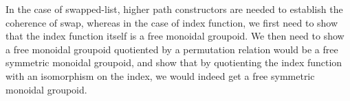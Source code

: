 \documentclass{article}
\begin{document}
In the case of swapped-list, higher path constructors are needed to establish the coherence of swap, whereas in the case of
index function, we first need to show that the index function itself is a free monoidal groupoid. We then need to show a free
monoidal groupoid quotiented by a permutation relation would be a free symmetric monoidal groupoid, and show that by quotienting
the index function with an isomorphism on the index, we would indeed get a free symmetric monoidal groupoid.


\printbibliography
\end{document}
